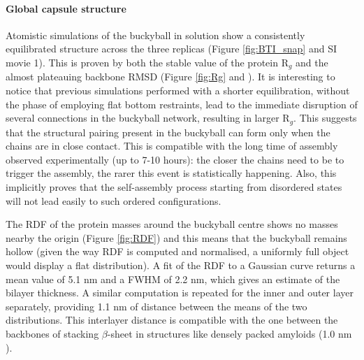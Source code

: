 \paragraph{Global capsule structure} Atomistic simulations of the buckyball in solution show a consistently equilibrated structure across the three replicas (Figure \ref{fig:BTI_snap} and SI movie 1).
%
This is proven by both the stable value of the protein R$_g$ and the almost plateauing backbone RMSD (Figure \ref{fig:Rg} and ). It is interesting to notice that previous simulations performed with a shorter equilibration, without the phase of employing flat bottom restraints, lead to the immediate disruption of several connections in the buckyball network, resulting in larger R$_g$. This suggests that the structural pairing present in the buckyball can form only when the chains are in close contact. This is compatible with the long time of assembly observed experimentally (up to 7-10 hours): the closer the chains need to be to trigger the assembly, the rarer this event is statistically happening. Also, this implicitly proves that the self-assembly process starting from disordered states will not lead easily to such ordered configurations.

The RDF of the protein masses around the buckyball centre shows no masses nearby the origin (Figure \ref{fig:RDF}) and this means that the buckyball remains hollow (given the way RDF is computed and normalised, a uniformly full object would display a flat distribution).
%
A fit of the RDF to a Gaussian curve returns a mean value of 5.1 nm and a FWHM of 2.2 nm, which gives an estimate of the bilayer thickness.
%
A similar computation is repeated for the inner and outer layer separately, providing 1.1 nm of distance between the means of the two distributions. This interlayer distance is compatible with the one between the backbones of stacking $\beta$-sheet in structures like densely packed amyloids (1.0 nm \citep{Sunde1997}).

